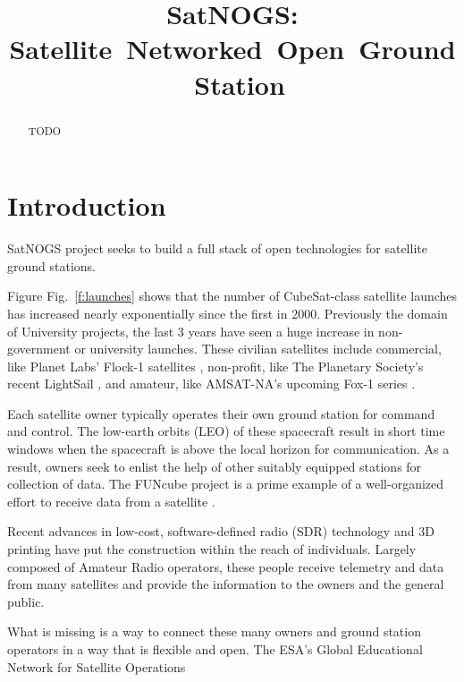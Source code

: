 \documentclass[conference]{IEEEtran}
\author{
    \IEEEauthorblockN{Daniel J. White\IEEEauthorrefmark{1},
        SatNOGS Developers\IEEEauthorrefmark{2}}
    \IEEEauthorblockA{\IEEEauthorrefmark{1}Valparaiso University, \href{mailto:dan.white@valpo.edu}{dan.white@valpo.edu}}
    \IEEEauthorblockA{\IEEEauthorrefmark{2}Libre Space Foundation,
    \href{mailto:info@satnogs.org}{info@satnogs.org}}
    
}
\title{SatNOGS: Satellite~Networked~Open~Ground~Station}
\newcommand{\figref}[1]{Fig.~\ref{#1}}
\begin{document}
\maketitle

\begin{abstract}
    TODO
\end{abstract}



\section{Introduction}
 SatNOGS\cite{SatNOGS} project seeks to build a full stack of open technologies for satellite ground stations.

Figure \figref{f:launches} shows that the number of CubeSat-class satellite launches has increased nearly exponentially since the first in 2000.
Previously the domain of University projects, the last 3 years have seen a huge increase in non-government or university launches.
These civilian satellites include commercial, like Planet Labs' Flock-1 satellites \cite{PlanetLabs}, non-profit, like The Planetary Society's recent LightSail \cite{PlanetarySociety}, and amateur, like AMSAT-NA's upcoming Fox-1 series \cite{AMSAT-NA}. 

Each satellite owner typically operates their own ground station for command and control.
The low-earth orbits (LEO) of these spacecraft result in short time windows when the spacecraft is above the local horizon for communication.
As a result, owners seek to enlist the help of other suitably equipped stations for collection of data.
The FUNcube project is a prime example of a well-organized effort to receive data from a satellite \cite{FUNcube}.

Recent advances in low-cost, software-defined radio (SDR) technology and 3D printing have put the construction within the reach of individuals.
Largely composed of Amateur Radio operators, these people receive telemetry and data from many satellites and provide the information to the owners and the general public.

What is missing is a way to connect these many owners and ground station operators in a way that is flexible and open.
The ESA's Global Educational Network for Satellite Operations \cite{GENSO}
\end{document}

